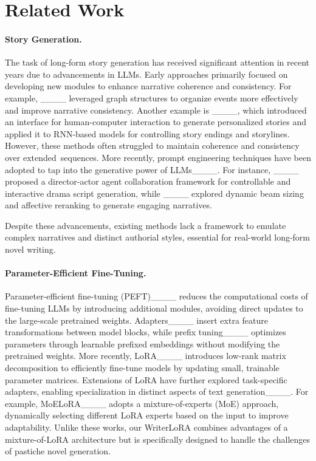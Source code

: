 \section{Related Work}
\paragraph{Story Generation.}
The task of long-form story generation has received significant attention in recent years due to advancements in LLMs.
Early approaches primarily focused on developing new modules to enhance narrative coherence and consistency.
For example, ____ leveraged graph structures to organize events more effectively and improve narrative consistency. 
Another example is ____, which introduced an interface for human-computer interaction to generate personalized stories and applied it to RNN-based models for controlling story endings and storylines.
However, these methods often struggled to maintain coherence and consistency over extended~sequences.
More recently, prompt engineering techniques have been adopted to tap into the generative power of LLMs____.
For instance, ____ proposed a director-actor agent collaboration framework for controllable and interactive drama script generation, while ____ explored dynamic beam sizing and affective reranking to generate engaging narratives.

Despite these advancements, existing methods lack a framework to emulate complex narratives and distinct authorial styles, essential for real-world long-form novel writing.



\paragraph{Parameter-Efficient Fine-Tuning.}

Parameter-efficient fine-tuning (PEFT)____ reduces the computational costs of fine-tuning LLMs by introducing additional modules, avoiding direct updates to the large-scale pretrained weights.
Adapters____ insert extra feature transformations between model blocks, while prefix tuning____ optimizes parameters through learnable prefixed embeddings without modifying the pretrained weights.
More recently, LoRA____ introduces low-rank matrix decomposition to efficiently fine-tune models by updating small, trainable parameter matrices. 
Extensions of LoRA have further explored task-specific adapters, enabling specialization in distinct aspects of text generation____.
For example, MoELoRA____ adopts a mixture-of-experts (MoE) approach, dynamically selecting different LoRA experts based on the input to improve adaptability. 
Unlike these works, our WriterLoRA combines advantages of a mixture-of-LoRA architecture but is specifically designed to handle the challenges of pastiche novel generation.


